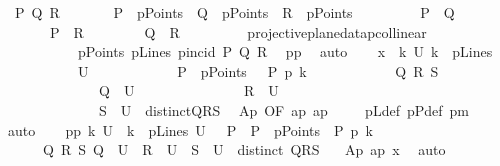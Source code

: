 \begin{isabellebody}
\ {\isachardoublequoteopen}\ {\isasymexists}P\ Q\ R{\isachardot}{\kern0pt}\isanewline
\ \ \ \ \ \ \ P\ {\isasymin}\ pPoints\ {\isasymand}\ Q\ {\isasymin}\ pPoints\ {\isasymand}\ R\ {\isasymin}\ pPoints\ \ {\isasymand}\isanewline
\ \ \ \ \ \ \ P\ {\isasymnoteq}\ Q\ {\isasymand}\isanewline
\ \ \ \ \ \ \ P\ {\isasymnoteq}\ R\ {\isasymand}\isanewline
\ \ \ \ \ \ \ Q\ {\isasymnoteq}\ R\ {\isasymand}\isanewline
\ \ \ \ \ \ \ {\isasymnot}\ projective{\isacharunderscore}{\kern0pt}plane{\isacharunderscore}{\kern0pt}data{}{\isachardot}{\kern0pt}pcollinear\isanewline
\ \ \ \ \ \ \ \ \ \ \ pPoints\ pLines\ pincid\ P\ Q\ R{\isachardoublequoteclose}\ \isamarkupfalse%
\ pp{}\ \isamarkupfalse%
\ auto\isanewline
\isanewline
\isanewline
\ \ \isamarkupfalse%
\ x{\isacharcolon}{\kern0pt}\ {\isachardoublequoteopen}\ {\isasymAnd}k\ U{\isachardot}{\kern0pt}\ k\ {\isasymin}\ pLines\ {\isasymLongrightarrow}\isanewline
\ \ \ \ \ \ \ \ \ \ \ U\ {\isacharequal}{\kern0pt}\isanewline
\ \ \ \ \ \ \ \ \ \ \ {\isacharbraceleft}{\kern0pt}P\ {\isasymin}\ pPoints\ {\isachardot}{\kern0pt}\ \ P\ p{\isasymlhd}\ k{\isacharbraceright}{\kern0pt}\ {\isasymLongrightarrow}\isanewline
\ \ \ \ \ \ \ \ \ \ \ {\isasymexists}Q\ R\ S{\isachardot}{\kern0pt}\isanewline
\ \ \ \ \ \ \ \ \ \ \ \ \ \ Q\ {\isasymin}\ U\ {\isasymand}\isanewline
\ \ \ \ \ \ \ \ \ \ \ \ \ \ R\ {\isasymin}\ U\ {\isasymand}\isanewline
\ \ \ \ \ \ \ \ \ \ \ \ \ \ S\ {\isasymin}\ U\ {\isasymand}\ distinct{\isacharbrackleft}{\kern0pt}Q{\isacharcomma}{\kern0pt}R{\isacharcomma}{\kern0pt}S{\isacharbrackright}{\kern0pt}{\isachardoublequoteclose}\ \isamarkupfalse%
\ Ap{}\ {\isacharbrackleft}{\kern0pt}OF\ ap{\isacharbrackright}{\kern0pt}\ ap\ \isanewline
\ \ \isamarkupfalse%
\ pLdef\ pPdef\ pm\ \isamarkupfalse%
\ auto\isanewline
\isanewline
\ \ \isamarkupfalse%
\ pp{}{\isacharcolon}{\kern0pt}\ {\isachardoublequoteopen}{\isasymAnd}k\ U\ {\isachardot}{\kern0pt}\ {\isacharparenleft}{\kern0pt}{\isasymlbrakk}k\ {\isasymin}\ pLines{\isacharsemicolon}{\kern0pt}\ U\ {\isacharequal}{\kern0pt}\ {\isacharbraceleft}{\kern0pt}\ P\ {\isachardot}{\kern0pt}\ {\isacharparenleft}{\kern0pt}P\ {\isasymin}\ pPoints\ {\isasymand}\ P\ p{\isasymlhd}\ k{\isacharparenright}{\kern0pt}{\isacharbraceright}{\kern0pt}\ {\isasymrbrakk}\ {\isasymLongrightarrow}\isanewline
\ \ \ \ \ \ {\isasymexists}Q\ R\ S{\isachardot}{\kern0pt}\ Q\ {\isasymin}\ U\ {\isasymand}\ R\ {\isasymin}\ U\ {\isasymand}\ S\ {\isasymin}\ U\ {\isasymand}\ distinct\ {\isacharbrackleft}{\kern0pt}Q{\isacharcomma}{\kern0pt}R{\isacharcomma}{\kern0pt}S{\isacharbrackright}{\kern0pt}\ {\isacharparenright}{\kern0pt}{\isachardoublequoteclose}\ \isamarkupfalse%
\ Ap{}\ ap\ x\ \isamarkupfalse%
\ auto\isanewline
{}\isamarkupfalse%
%
\endisatagproof
{\isafoldproof}%
%
\isadelimproof
%
\endisadelimproof
%
\begin{isamarkuptext}%
\hartshorne


\end{isamarkuptext}
\end{isabellebody}
